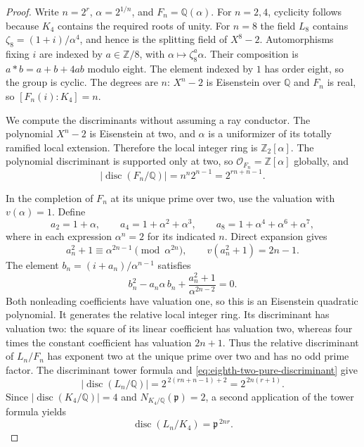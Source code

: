 \begin{proof}
Write $n=2^r$, $\alpha=2^{1/n}$, and $F_n=\mathbb Q(\alpha)$.
For $n=2,4$, cyclicity follows because $K_4$ contains the required
roots of unity.  For $n=8$ the field $L_8$ contains
$\zeta_8=(1+i)/\alpha^4$, and hence is the splitting field of
$X^8-2$.  Automorphisms fixing $i$ are indexed by
$a\in\mathbb Z/8$, with $\alpha\mapsto\zeta_8^a\alpha$.
Their composition is
$a*b=a+b+4ab$ modulo eight.  The element indexed by $1$ has
order eight, so the group is cyclic.  The degrees are $n$:
$X^n-2$ is Eisenstein over $\mathbb Q$ and $F_n$ is real,
so $[F_n(i):K_4]=n$.

We compute the discriminants without assuming a ray conductor.
The polynomial $X^n-2$ is Eisenstein at two, and $\alpha$ is a
uniformizer of its totally ramified local extension.  Therefore
the local integer ring is $\mathbb Z_2[\alpha]$.
The polynomial discriminant is supported only at two, so
$\mathcal O_{F_n}=\mathbb Z[\alpha]$ globally, and
\begin{equation}
 |\operatorname{disc}(F_n/\mathbb Q)|
       =n^n2^{n-1}=2^{rn+n-1}.
 \label{eq:eighth-two-pure-discriminant}
\end{equation}

In the completion of $F_n$ at its unique prime over two, use
the valuation with $v(\alpha)=1$.  Define
\[
 a_2=1+\alpha,\qquad
 a_4=1+\alpha^2+\alpha^3,\qquad
 a_8=1+\alpha^4+\alpha^6+\alpha^7,
\]
where in each expression $\alpha^n=2$ for its indicated $n$.
Direct expansion gives
\[
 a_n^2+1\equiv\alpha^{2n-1}\pmod{\alpha^{2n}},
 \qquad v(a_n^2+1)=2n-1.
\]
The element
$b_n=(i+a_n)/\alpha^{n-1}$ satisfies
\begin{equation}
 b_n^2-a_n\alpha\,b_n+
              \frac{a_n^2+1}{\alpha^{2n-2}}=0.
 \label{eq:eighth-two-eisenstein}
\end{equation}
Both nonleading coefficients have valuation one, so this is an
Eisenstein quadratic polynomial.  It generates the relative local
integer ring.  Its discriminant has valuation two: the square
of its linear coefficient has valuation two, whereas four times
the constant coefficient has valuation $2n+1$.
Thus the relative discriminant of $L_n/F_n$ has exponent two
at the unique prime over two and has no odd prime factor.
The discriminant tower formula and
\eqref{eq:eighth-two-pure-discriminant} give
\[
 |\operatorname{disc}(L_n/\mathbb Q)|
       =2^{\,2(rn+n-1)+2}=2^{\,2n(r+1)}.
\]
Since $|\operatorname{disc}(K_4/\mathbb Q)|=4$ and
$N_{K_4/\mathbb Q}(\mathfrak p)=2$, a second application of
the tower formula yields
\begin{equation}
 \operatorname{disc}(L_n/K_4)=\mathfrak p^{\,2nr}.
 \label{eq:eighth-two-gaussian-discriminant}
\end{equation}


\end{proof}
